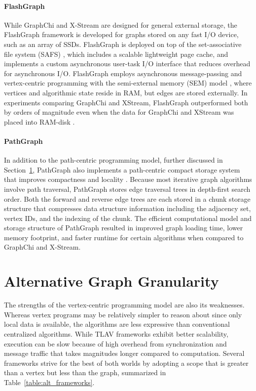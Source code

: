 \documentclass[reprint,twocolumn,showpacs,preprintnumbers,amsmath, aps,pre,amssymb]{revtex4-1}
\begin{document}
\paragraph*{FlashGraph} While GraphChi and X-Stream are designed for general external storage, the FlashGraph framework is developed for graphs stored on any fast I/O device, such as an array of SSDs.  FlashGraph is deployed on top of the set-associative file system (SAFS) \cite{Zheng2015}, which includes a scalable lightweight page cache, and implements a custom asynchronous user-task I/O interface that reduces overhead for asynchronous I/O.  FlashGraph employs asynchronous message-passing and vertex-centric programming with the semi-external memory (SEM) model \cite{Pearce2010}, where vertices and algorithmic state reside in RAM, but edges are stored externally. In experiments comparing GraphChi and XStream, FlashGraph outperformed both by orders of magnitude even when the data for GraphChi and XStream was placed into RAM-disk \cite{Zheng2015}.  

\paragraph*{PathGraph} In addition to the path-centric programming model, further discussed in Section~\ref{sec:alt}, PathGraph also implements a path-centric compact storage system that improves compactness and locality \cite{Yuan}.  Because most iterative graph algorithms involve path traversal, PathGraph stores edge traversal trees in depth-first search order.  Both the forward and reverse edge trees are each stored in a chunk storage structure that compresses data structure information including the adjacency set, vertex IDs, and the indexing of the chunk.  The efficient computational model and storage structure of PathGraph resulted in improved graph loading time, lower memory footprint, and faster runtime for certain algorithms when compared to GraphChi and X-Stream.

\section{Alternative Graph Granularity}
\label{sec:alt}

The strengths of the vertex-centric programming model are also its weaknesses.  Whereas vertex programs may be relatively simpler to reason about since only local data is available, the algorithms are less expressive than conventional centralized algorithms.  While TLAV frameworks exhibit better scalability, execution can be slow because of high overhead from synchronization and message traffic that takes magnitudes longer compared to computation.  Several frameworks strive for the best of both worlds by adopting a scope that is greater than a vertex but less than the graph, summarized in Table~\ref{table:alt_frameworks}.
\end{document}

